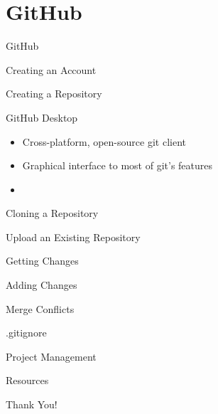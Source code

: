\documentclass{beamer}
\begin{document}
    \section{GitHub}\label{sec:github}
    \begin{frame}{GitHub}
    \end{frame}

    \begin{frame}{Creating an Account}
    \end{frame}

    \begin{frame}{Creating a Repository}
    \end{frame}

    \begin{frame}{GitHub Desktop}
        \begin{itemize}
            \item Cross-platform, open-source git client
            \item Graphical interface to most of git's features
            \item
        \end{itemize}
    \end{frame}

    \begin{frame}{Cloning a Repository}
    \end{frame}

    \begin{frame}{Upload an Existing Repository}
    \end{frame}

    \begin{frame}{Getting Changes}
    \end{frame}

    \begin{frame}{Adding Changes}
    \end{frame}

    \begin{frame}{Merge Conflicts}
    \end{frame}

    \begin{frame}{.gitignore}
    \end{frame}

    \begin{frame}{Project Management}
    \end{frame}

    \begin{frame}{Resources}
    \end{frame}

    \begin{frame}{Thank You!}
    \end{frame}
\end{document}
